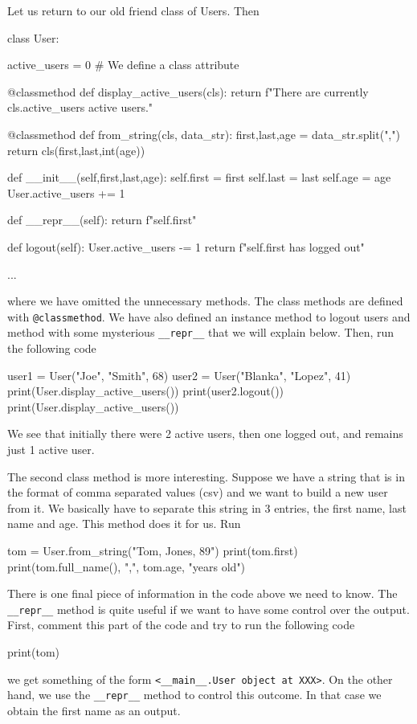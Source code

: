 Let us return to our old friend class of Users. Then 
\begin{listing}{1}
class User: 

    active_users = 0 # We define a class attribute

    @classmethod
    def display_active_users(cls):
        return f"There are currently {cls.active_users} active users."

    @classmethod
    def from_string(cls, data_str):
        first,last,age = data_str.split(",")        
        return cls(first,last,int(age))

    def __init__(self,first,last,age):
        self.first = first
        self.last = last
        self.age = age
        User.active_users += 1
		
	def __repr__(self):
		return f"{self.first}"	

    def logout(self): 
        User.active_users -= 1 
        return f"{self.first} has logged out"  

...	
\end{listing}
where we have omitted the unnecessary methods. The class methods are defined with \verb|@classmethod|. We have also defined an instance method to logout users and method with some mysterious \verb|__repr__| that we will explain below. Then, run the following code 
\begin{listingcont}
user1 = User("Joe", "Smith", 68)        
user2 = User("Blanka", "Lopez", 41)
print(User.display_active_users())
print(user2.logout())
print(User.display_active_users())	
\end{listingcont}
We see that initially there were 2 active users, then one logged out, and remains just 1 active user. 

The second class method is more interesting. Suppose we have a string that is in the format of comma separated values (csv) and we want to build a new user from it. We basically have to separate this string in 3 entries, the first name, last name and age. This method does it for us. Run 
\begin{listingcont}
tom = User.from_string("Tom, Jones, 89")
print(tom.first) 
print(tom.full_name(), ",", tom.age, "years old")
\end{listingcont}

There is one final piece of information in the code above we need to know. The \verb|__repr__| method is quite useful if we want to have some control over the output. First, comment this part of the code and try to run the following code
\begin{listingcont}
print(tom)
\end{listingcont}
we get something of the form \verb|<__main__.User object at XXX>|. On the other hand, we use the \verb|__repr__| method to control this outcome. In that case we obtain the first name as an output. 


